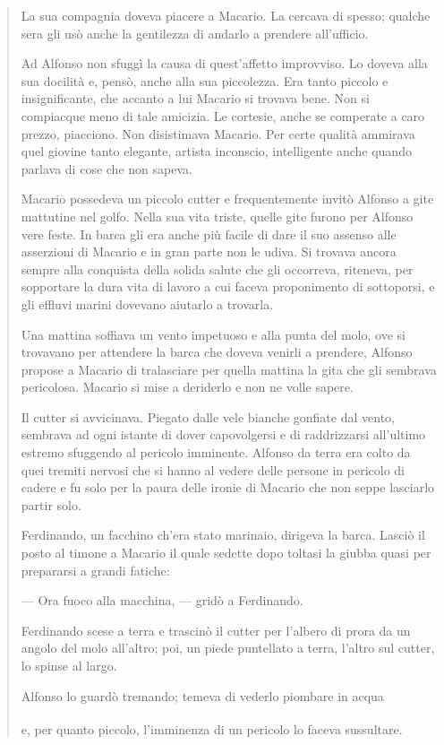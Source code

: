 \documentclass[a4paper, twoside, titlepage]{book}
\newcounter{mar}
\newcommand{\mar}[2]{
\addtocounter{mar}{1}
\hspace{-0.73em}\textsuperscript{\hyperref[\thechapter.\themar]{\themar}}\marginpar{{\small\textbf{\themar}\label{\thechapter.\themar}. #2}}\hspace{-0.4em}
}
\newcommand{\mat}[1]{\mar{gg}{#1}}
\begin{document}
\setcounter{mar}{0}
\begin{quotation}
La sua compagnia doveva piacere a Macario. La cercava di spesso; qualche sera gli usò anche la gentilezza di andarlo a prendere all’ufficio.

Ad Alfonso non sfuggì la causa di quest’affetto improvviso. Lo doveva alla sua docilità e, pensò, anche alla sua piccolezza. Era tanto piccolo e insignificante, che accanto a lui Macario si trovava bene. Non si compiacque meno di tale amicizia. Le cortesie, anche se comperate a caro prezzo, piacciono. Non disistimava Macario. Per certe qualità ammirava quel giovine tanto elegante, artista inconscio, intelligente anche quando parlava di cose che non sapeva.

Macario possedeva un piccolo cutter e frequentemente invitò Alfonso a gite mattutine nel golfo. Nella sua vita triste, quelle gite furono per Alfonso vere feste. In barca gli era anche più facile di dare il suo assenso alle asserzioni di Macario e in gran parte non le udiva. Si trovava ancora sempre alla conquista della solida salute che gli occorreva, riteneva, per sopportare la dura vita di lavoro a cui faceva proponimento di sottoporsi, e gli effluvi marini dovevano aiutarlo a trovarla.

Una mattina soffiava un vento impetuoso e alla punta del molo, ove si trovavano per attendere la barca che doveva venirli a prendere, Alfonso propose a Macario di tralasciare per quella mattina la gita che gli sembrava pericolosa. Macario si mise a deriderlo e non ne volle sapere.

Il cutter si avvicinava. Piegato dalle vele bianche gonfiate dal vento, sembrava ad ogni istante di dover capovolgersi e di raddrizzarsi all’ultimo estremo sfuggendo al pericolo imminente. Alfonso da terra era colto da quei tremiti nervosi che si hanno al vedere delle persone in pericolo di cadere e fu solo per la paura delle ironie di Macario che non seppe lasciarlo partir solo.

Ferdinando, un facchino ch’era stato marinaio, dirigeva la barca. Lasciò il posto al timone a Macario il quale sedette dopo toltasi la giubba quasi per prepararsi a grandi fatiche:

— Ora fuoco alla macchina, — gridò a Ferdinando.

Ferdinando scese a terra e trascinò il cutter per l’albero di prora da un angolo del molo all’altro; poi, un piede puntellato a terra, l’altro sul cutter, lo spinse al largo.

Alfonso lo guardò tremando; temeva di vederlo piombare in acqua\mat{paura per sé e per gli altri} e, per quanto piccolo, l’imminenza di un pericolo lo faceva sussultare.


\end{quotation}
\end{document}
